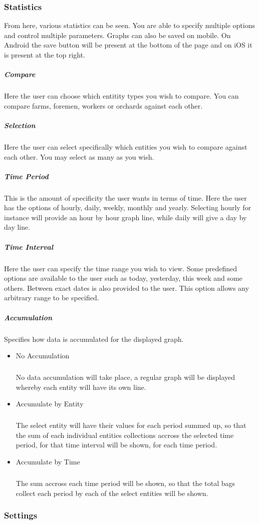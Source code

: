 \documentclass[11pt]{article}
\begin{document}
\subsubsection{Statistics}
\label{Mobile Statistics}

From here, various statistics can be seen. You are able to specify multiple options and control multiple parameters. Graphs can also be saved on mobile. On Android the save button will be present at the bottom of the page and on iOS it is present at the top right.

\subparagraph{Compare} Here the user can choose which entitity types you wish to compare. You can compare farms, foremen, workers or orchards
against each other.
\subparagraph{Selection} Here the user can select specifically which entities you wish to compare against each other. You may select as many as you wish.
\subparagraph{Time Period} This is the amount of specificity the user wants in terms of time. Here the user has the options of hourly, daily, weekly, monthly and yearly. Selecting hourly for instance will provide an hour by hour graph line, while daily will give a day by day line.
\subparagraph{Time Interval} Here the user can specify the time range you wish to view. Some predefined options are available to the user such as
today, yesterday, this week and some others. Between exact dates is also provided to the user. This option allows any arbitrary range to be specified.
\subparagraph{Accumulation} Specifies how data is accumulated for the displayed graph.
\begin{itemize}
\item No Accumulation
	\subparagraph{} No data accumulation will take place, a regular graph will be displayed whereby each entity will have its own line.
\item Accumulate by Entity
	\subparagraph{} The select entity will have their values for each period summed up, so that the sum of each individual entities collections accross the selected time period, for that time interval will be shown, for each time period.
\item Accumulate by Time
	\subparagraph{} The sum accross each time period will be shown, so that the total bags collect each period by each of the select entities will be shown.
\end{itemize}

\subsubsection{Settings}
\label{Mobile Settings}
\end{document}
